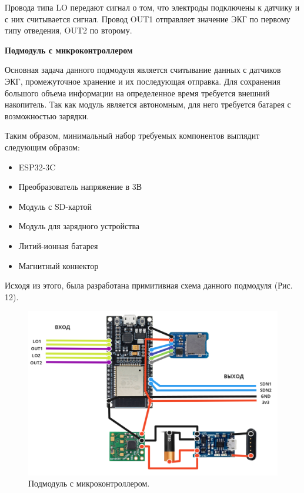 \documentclass[12pt, russian]{extarticle}
\begin{document}
\begin{spacing}{1.5}
Провода типа LO передают сигнал о том, что электроды подключены к датчику и с них считывается сигнал. Провод OUT1 отправляет значение ЭКГ по первому типу отведения, OUT2 по второму.

\par\textbf{Подмодуль с микроконтроллером}

Основная задача данного подмодуля является считывание данных с датчиков ЭКГ, промежуточное хранение и их последующая отправка. Для сохранения большого объема информации на определенное время требуется внешний накопитель. Так как модуль является автономным, для него требуется батарея с возможностью зарядки.

Таким образом, минимальный набор требуемых компонентов выглядит следующим образом:

\begin{itemize}
    \item ESP32-3C
    \item Преобразователь напряжение в 3В
    \item Модуль с SD-картой
    \item Модуль для зарядного устройства
    \item Литий-ионная батарея
    \item Магнитный коннектор
\end{itemize}

Исходя из этого, была разработана примитивная схема данного подмодуля (Рис. 12).
\newpage

\begin{figure}[htbp]
\centering
\includegraphics[scale=0.48]{resources/2.png}
\caption{Подмодуль с микроконтроллером.}
\label{fig:my_label}
\end{figure}


\end{spacing}
\end{document}
